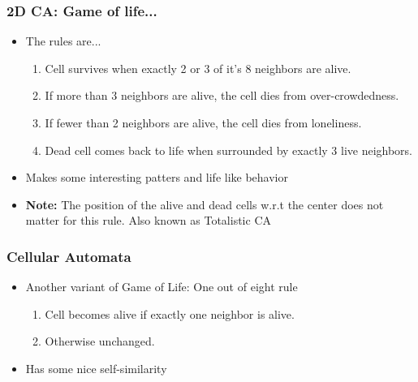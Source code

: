 \documentclass{beamer}
\begin{document}
\begin{frame}
    \frametitle{2D CA: Game of life...}
    \begin{itemize}
        \item The rules are...
        \begin{enumerate}
            \item Cell survives when exactly 2 or 3 of it's 8 neighbors are alive.
            \item If more than 3 neighbors are alive, the cell dies from over-crowdedness.
            \item If fewer than 2 neighbors are alive, the cell dies from loneliness.
            \item Dead cell comes back to life when surrounded by exactly 3 live neighbors.  
        \end{enumerate}
        \item Makes some interesting patters and life like behavior 
        \item \textbf{Note:} The position of the alive and dead cells w.r.t the center does not matter for this rule. Also known as Totalistic CA
    \end{itemize}
\end{frame}


\begin{frame}
    \frametitle{Cellular Automata}
    \begin{itemize}
        \item Another variant of Game of Life: One out of eight rule
        \begin{enumerate}
            \item Cell becomes alive if exactly one neighbor is alive.
            \item Otherwise unchanged.
        \end{enumerate}
        \item Has some nice self-similarity
    \end{itemize}
\end{frame}
\end{document}
